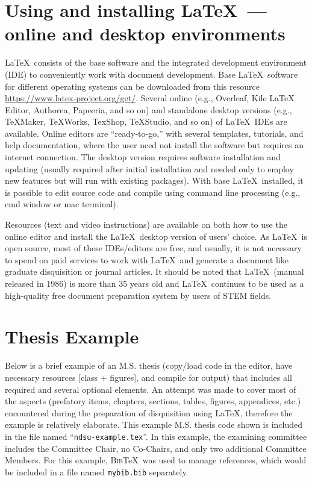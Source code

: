 \documentclass[letterpaper]{refart}
\begin{document}
\section{Using and installing \LaTeX\  --- online and desktop environments}  

\LaTeX\ consists of the base software and the integrated development environment (IDE) to conveniently work with document development. Base \LaTeX\ software for different operating systems can be downloaded from this resource \url{https://www.latex-project.org/get/}. Several online (e.g., Overleaf, Kile LaTeX Editor, Authorea, Papeeria, and so on) and standalone desktop versions (e.g., TeXMaker, TeXWorks, TexShop, TeXStudio, and so on) of \LaTeX\ IDEs are available. Online editors are ``ready-to-go,'' with several templates, tutorials, and help documentation, where the user need not install the software but requires an internet connection. The desktop version requires software installation and updating (usually required after initial installation and needed only to employ new features but will run with existing packages). With base \LaTeX\ installed, it is possible to edit source code and compile using command line processing (e.g., cmd window or mac terminal).   

Resources (text and video instructions) are available on both how to use the online editor and install the \LaTeX\ desktop version of users' choice. As \LaTeX\ is open source, most of these IDEs/editors are free, and usually, it is not necessary to spend on paid services to work with \LaTeX\ and generate a document like graduate disquisition or journal articles. It should be noted that \LaTeX\ (manual released in 1986) is more than 35 years old and \LaTeX\ continues to be used as a high-quality free document preparation system by users of STEM fields.

\section{Thesis Example}\label{example}
Below is a brief example of an M.S. thesis (copy/load code in the editor, have necessary resources [class + figures], and compile for output) that includes all required and several optional elements. An attempt was made to cover most of the aspects (prefatory items, chapters, sections, tables, figures, appendices, etc.) encountered during the preparation of disquisition using \LaTeX, therefore the example is relatively elaborate. This example M.S. thesis code shown is included in the file named ``\texttt{ndsu-example.tex}''. In this example, the examining committee includes the Committee Chair, no Co-Chairs, and only two additional Committee Members. For this example, \textsc{Bib}\TeX\ was used to manage references, which would be included in a file named \texttt{mybib.bib} separately.
\end{document}
